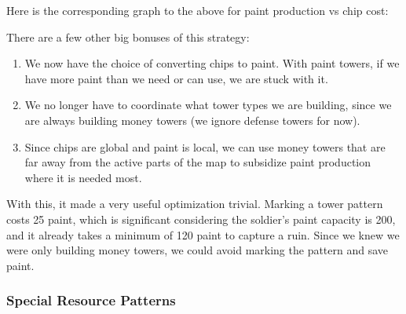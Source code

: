  \medskip

  Here is the corresponding graph to the above for paint production vs chip cost:
  \begin{center}
  \end{center}
  There are a few other big bonuses of this strategy:
  \begin{enumerate}
    \item We now have the choice of converting chips to paint. With paint towers, if we have more paint than we need or can use, we are stuck with it.
    \item We no longer have to coordinate what tower types we are building, since we are always building money towers (we ignore defense towers for now).
    \item Since chips are global and paint is local, we can use money towers that are far away from the active parts of the map to subsidize paint production where it is needed most.
  \end{enumerate}
  With this, it made a very useful optimization trivial. Marking a tower pattern costs 25 paint, which is significant considering the soldier's paint capacity is 200, and it already takes a minimum of 120 paint to capture a ruin. Since we knew we were only building money towers, we could avoid marking the pattern and save paint.

  \subsubsection{Special Resource Patterns}

